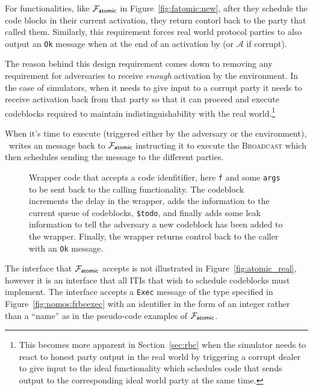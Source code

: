 For functionalities, like $\mathcal{F}_{{\mathsf {atomic}}}$ in Figure~\ref{fig:fatomic:new}, after they schedule the code blocks in their current activation, they return contorl back to the party that called them.
Similarly, this requirement forces real world protocol parties to also output an \texttt{Ok} message when at the end of an activation by \Environment (or $\mathcal{A}$ if corrupt).

The reason behind this design requirement comes down to removing any requirement for adversaries to receive \textit{enough} activation by the environment.
In the case of simulators, when it needs to give input to a corrupt party it needs to receive activation back from that party so that it can proceed and execute codeblocks required to maintain indistinguishability with the real world.\footnote{This becomes more apparent in Section~\ref{sec:rbc} when the simulator needs to react to honest party output in the real world by triggering a corrupt dealer to give input to the ideal functionality which schedules code that sends output to the corresponding ideal world party at the same time.}

When it's time to execute (triggered either by the adversary or the environment), \Wasync~writes an \Exec message back to $\mathcal{F}_{{\mathsf {atomic}}}$ instructing it to execute the \textsc{Broadcast} which then schedules sending the message to the different parties. 

\begin{figure}[!ht]

\caption{Wrapper code that accepts a code idenfitifier, here \texttt{f} and some \texttt{args} to be sent back to the calling functionality. The codeblock increments the delay in the wrapper, adds the information to the current queue of codeblocks, \texttt{\$todo}, and finally adds some leak information to tell the adversary a new codeblock has been added to the wrapper. Finally, the wrapper returns control back to the caller with an \texttt{Ok} message.}
\label{fig:wrapper:schedule}
\end{figure}

The \Exec interface that $\mathcal{F}_{{\mathsf {atomic}}}$ accepts is not illustrated in Figure~\ref{fig:atomic_real}, however it is an interface that all ITIs that wish to schedule codeblocks must implement.
The interface accepts a \texttt{Exec} message of the type specified in Figure~\ref{fig:nomos:frbcexec} with an identifier in the form of an integer rather than a ``name'' as in the pseudo-code examples of $\mathcal{F}_{{\mathsf {atomic}}}$.

